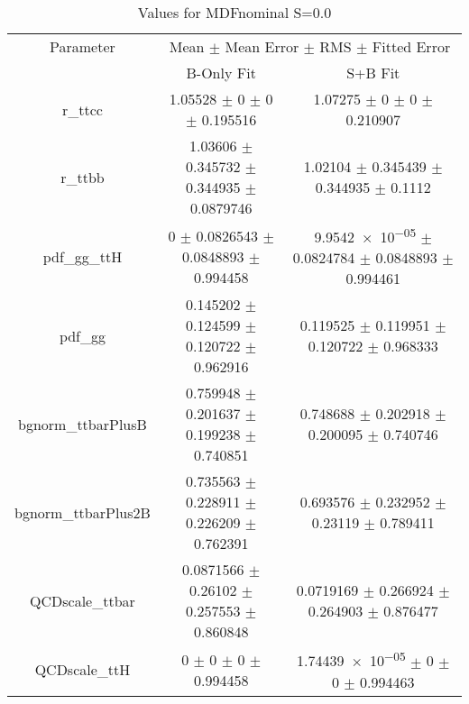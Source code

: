 \begin{table}
\centering
\caption{Values for MDFnominal S=0.0}
\begin{tabular}{ccc}
\toprule
Parameter & \multicolumn{2}{c}{Mean $\pm$ Mean Error $\pm$ RMS $\pm$ Fitted Error}\\
 & B-Only Fit & S+B Fit\\
\midrule
r\_ttcc & \num{1.05528} $\pm$ \num{0} $\pm$ \num{0} $\pm$ \num{0.195516} & \num{1.07275} $\pm$ \num{0} $\pm$ \num{0} $\pm$ \num{0.210907}\\
r\_ttbb & \num{1.03606} $\pm$ \num{0.345732} $\pm$ \num{0.344935} $\pm$ \num{0.0879746} & \num{1.02104} $\pm$ \num{0.345439} $\pm$ \num{0.344935} $\pm$ \num{0.1112}\\
pdf\_gg\_ttH & \num{0} $\pm$ \num{0.0826543} $\pm$ \num{0.0848893} $\pm$ \num{0.994458} & \num{9.9542e-05} $\pm$ \num{0.0824784} $\pm$ \num{0.0848893} $\pm$ \num{0.994461}\\
pdf\_gg & \num{0.145202} $\pm$ \num{0.124599} $\pm$ \num{0.120722} $\pm$ \num{0.962916} & \num{0.119525} $\pm$ \num{0.119951} $\pm$ \num{0.120722} $\pm$ \num{0.968333}\\
bgnorm\_ttbarPlusB & \num{0.759948} $\pm$ \num{0.201637} $\pm$ \num{0.199238} $\pm$ \num{0.740851} & \num{0.748688} $\pm$ \num{0.202918} $\pm$ \num{0.200095} $\pm$ \num{0.740746}\\
bgnorm\_ttbarPlus2B & \num{0.735563} $\pm$ \num{0.228911} $\pm$ \num{0.226209} $\pm$ \num{0.762391} & \num{0.693576} $\pm$ \num{0.232952} $\pm$ \num{0.23119} $\pm$ \num{0.789411}\\
QCDscale\_ttbar & \num{0.0871566} $\pm$ \num{0.26102} $\pm$ \num{0.257553} $\pm$ \num{0.860848} & \num{0.0719169} $\pm$ \num{0.266924} $\pm$ \num{0.264903} $\pm$ \num{0.876477}\\
QCDscale\_ttH & \num{0} $\pm$ \num{0} $\pm$ \num{0} $\pm$ \num{0.994458} & \num{1.74439e-05} $\pm$ \num{0} $\pm$ \num{0} $\pm$ \num{0.994463}\\
\bottomrule
\end{tabular}
\end{table}